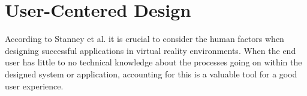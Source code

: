 \section{User-Centered Design}
According to Stanney et al. it is crucial to consider the human factors when designing successful applications in virtual reality environments. When the end user has little to no technical knowledge about the processes going on within the designed system or application, accounting for this is a valuable tool for a good user experience.
\cite{UCD:stanney1998human}
